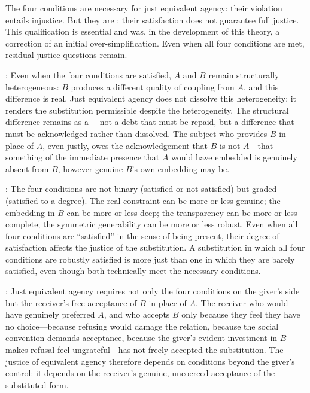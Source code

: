 \noindent
The four conditions are necessary for just equivalent agency: their violation entails injustice. But they are : their satisfaction does not guarantee full justice. This qualification is essential and was, in the development of this theory, a correction of an initial over-simplification. Even when all four conditions are met, residual justice questions remain.

: Even when the four conditions are satisfied, $A$ and $B$ remain structurally heterogeneous: $B$ produces a different quality of coupling from $A$, and this difference is real. Just equivalent agency does not dissolve this heterogeneity; it renders the substitution permissible despite the heterogeneity. The structural difference remains as a ---not a debt that must be repaid, but a difference that must be acknowledged rather than dissolved. The subject who provides $B$ in place of $A$, even justly, owes the acknowledgement that $B$ is not $A$---that something of the immediate presence that $A$ would have embedded is genuinely absent from $B$, however genuine $B$'s own embedding may be.

: The four conditions are not binary (satisfied or not satisfied) but graded (satisfied to a degree). The real constraint can be more or less genuine; the embedding in $B$ can be more or less deep; the transparency can be more or less complete; the symmetric generability can be more or less robust. Even when all four conditions are ``satisfied'' in the sense of being present, their degree of satisfaction affects the justice of the substitution. A substitution in which all four conditions are robustly satisfied is more just than one in which they are barely satisfied, even though both technically meet the necessary conditions.

: Just equivalent agency requires not only the four conditions on the giver's side but the receiver's free acceptance of $B$ in place of $A$. The receiver who would have genuinely preferred $A$, and who accepts $B$ only because they feel they have no choice---because refusing would damage the relation, because the social convention demands acceptance, because the giver's evident investment in $B$ makes refusal feel ungrateful---has not freely accepted the substitution. The justice of equivalent agency therefore depends on conditions beyond the giver's control: it depends on the receiver's genuine, uncoerced acceptance of the substituted form.

